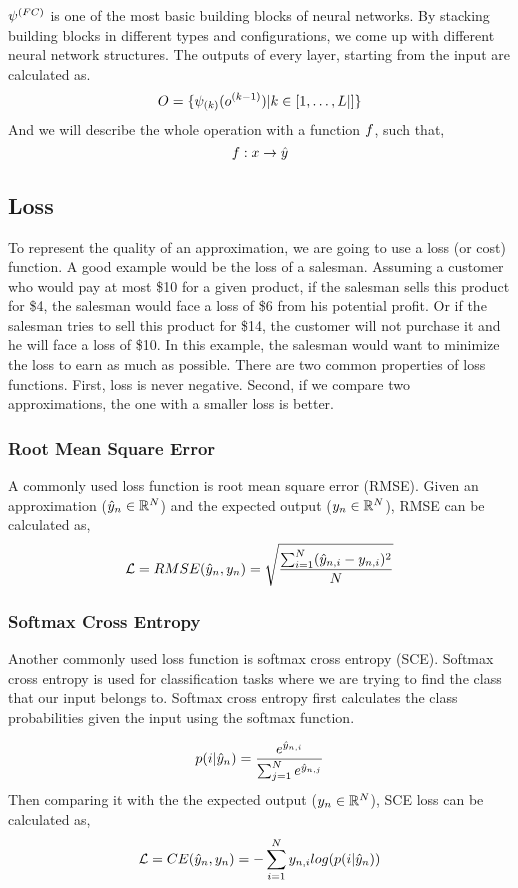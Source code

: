 $\psi^{(FC)}$ is one of the most basic building blocks of neural networks. By stacking building blocks in different types and configurations, we come up with different neural network structures. The outputs of every layer, starting from the input are calculated as. 
$$ \all\outputvar = \{\lfk{k}(\ok{k-1}) | k \in [1, \ldots, \num\layer|] \} $$
And we will describe the whole operation with a function $f$, such that, 
$$f : x \rightarrow \hat{y}$$
\subsection{Loss}

To represent the quality of an approximation, we are going to use a loss (or cost) function. A good example would be the loss of a salesman. Assuming a customer who would pay at most \$10 for a given product, if the salesman sells this product for \$4, the salesman would face a loss of \$6 from his potential profit. Or if the salesman tries to sell this product for \$14, the customer will not purchase it and he will face a loss of \$10. In this example, the salesman would want to minimize the loss to earn as much as possible. There are two common properties of loss functions. First, loss is never negative. Second, if we compare two approximations, the one with a smaller loss is better.

\subsubsection{Root Mean Square Error}
A commonly used loss function is root mean square error (RMSE). Given an approximation ($\hat{y}_{n} \in \mathbb{R}^{N}$) and the expected output ($y_{n} \in \mathbb{R}^{N}$), RMSE can be calculated as,
\begin{equation*}
\mathcal{L} = RMSE(\hat{y}_{n}, y_{n}) = \sqrt{\frac{\sum^N_{i=1} (\hat{y}_{n,i} - y_{n,i})^2 }{N}}
\end{equation*}

\subsubsection{Softmax Cross Entropy}
Another commonly used loss function is softmax cross entropy (SCE). Softmax cross entropy is used for classification tasks where we are trying to find the class that our input belongs to. Softmax cross entropy first calculates the class probabilities given the input using the softmax function.

$$p(i | \hat{y}_{n}) = \frac{e^{\hat{y}_{n,i}}}{\sum_{j=1}^{N}e^{\hat{y}_{n,j}}}$$
Then comparing it with the the expected output ($y_{n} \in \mathbb{R}^{N}$), SCE loss can be calculated as,
$$\mathcal{L} = CE(\hat{y}_{n}, y_{n}) = - \sum_{i=1}^{N} y_{n,i} log(p(i | \hat{y}_{n}))$$

